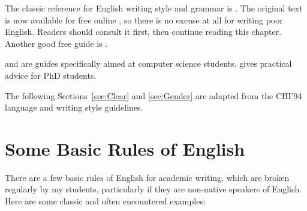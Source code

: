 The classic reference for English writing style and grammar is
\textcite{StrunkWhite}. The original text is now available for free
online \cite{Strunk}, so there is no excuse at all for writing poor
English. Readers should consult it first, then continue reading this
chapter. Another good free guide is \textcite{NASAGuide}.



\textcite{Zobel-WritingCompSci} and \textcite{BugsInWriting} are guides
specifically aimed at computer science students.
\textcite{Phillips-HowGetPhD} gives practical advice for PhD
students.

The following Sections~\ref{sec:Clear} and \ref{sec:Gender} are
adapted from the CHI'94 language and writing style guidelines.







\section{Some Basic Rules of English}

There are a few basic rules of English for academic writing, which are
broken regularly by my students, particularly if they are non-native
speakers of English. Here are some classic and often encountered
examples:

